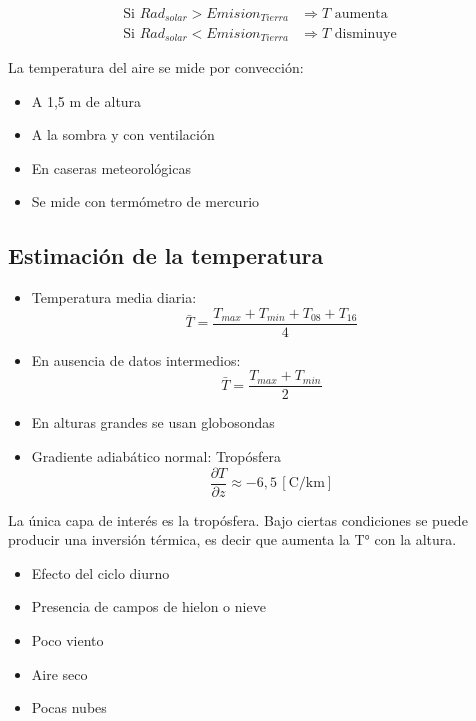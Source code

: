 \begin{align}
    \text{Si } Rad_{solar} > Emision_{Tierra} &\Rightarrow T \text{ aumenta} \\
    \text{Si } Rad_{solar} < Emision_{Tierra} &\Rightarrow T \text{ disminuye}
\end{align}

La temperatura del aire se mide por convección:
\begin{itemize}
    \item A 1,5 m de altura
    \item A la sombra y con ventilación
    \item En caseras meteorológicas
    \item Se mide con termómetro de mercurio
\end{itemize}

\subsection{Estimación de la temperatura}

\begin{itemize}
    \item Temperatura media diaria:
    \begin{equation}
        \bar{T} = \frac{T_{max} + T_{min} + T_{08} + T_{16}}{4}
    \end{equation}
    \item En ausencia de datos intermedios:
    \begin{equation}
        \bar{T} = \frac{T_{max} + T_{min}}{2}
    \end{equation}
    \item En alturas grandes se usan globosondas
    \item Gradiente adiabático normal: Tropósfera
    \begin{equation}
        \frac{\partial T}{\partial z} \approx -6{,}5 \, \left[\text{C/km}\right]
    \end{equation}
\end{itemize}

La única capa de interés es la tropósfera. Bajo ciertas condiciones se puede producir una inversión térmica, es decir que aumenta la T° con la altura.
\begin{itemize}
    \item Efecto del ciclo diurno
    \item Presencia de campos de hielon o nieve
    \item Poco viento
    \item Aire seco
    \item Pocas nubes
\end{itemize}

